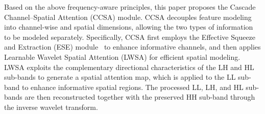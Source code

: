 \documentclass[a4paper,fleqn]{cas-dc}
\begin{document}
Based on the above {frequency-aware principles}, this paper proposes the Cascade Channel--Spatial Attention (CCSA) module. 
{\color{blue}CCSA decouples feature modeling into channel-wise and spatial dimensions, allowing the two types of information to be modeled separately.} 
{\color{blue}Specifically, CCSA first employs the Effective Squeeze and Extraction (ESE) module~\cite{lee2020centermask} to enhance informative channels, and then applies Learnable Wavelet Spatial Attention (LWSA) for efficient spatial modeling.} 
{\color{blue}LWSA exploits the complementary directional characteristics of the LH and HL sub-bands to generate a spatial attention map, which is applied to the LL sub-band to enhance informative spatial regions. The processed LL, LH, and HL sub-bands are then reconstructed together with the preserved HH sub-band through the inverse wavelet transform.}

\end{document}
